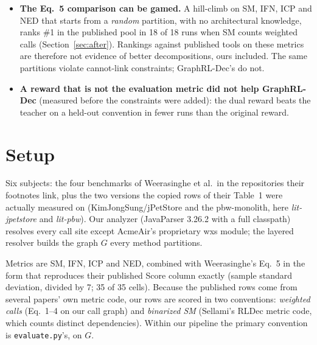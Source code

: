\documentclass[10pt,a4paper]{article}
\begin{document}
\begin{itemize}
\item \textbf{The Eq.~5 comparison can be gamed.} A hill-climb on SM, IFN, ICP and NED that starts from a \emph{random} partition, with no architectural knowledge, ranks \#1 in the published pool in 18 of 18 runs when SM counts weighted calls (Section~\ref{sec:after}). Rankings against published tools on these metrics are therefore not evidence of better decompositions, ours included. The same partitions violate cannot-link constraints; GraphRL-Dec's do not.
\item \textbf{A reward that is not the evaluation metric did not help GraphRL-Dec} (measured before the constraints were added): the dual reward beats the teacher on a held-out convention in fewer runs than the original reward.
\end{itemize}
\section{Setup}
Six subjects: the four benchmarks of Weerasinghe et al.\ in the repositories their footnotes link, plus the two versions the copied rows of their Table~1 were actually measured on (KimJongSung/jPetStore and the pbw-monolith, here \emph{lit-jpetstore} and \emph{lit-pbw}). Our analyzer (JavaParser 3.26.2 with a full classpath) resolves every call site except AcmeAir's proprietary wxs module; the layered resolver builds the graph $G$ every method partitions.
\begin{center}\end{center}
Metrics are SM, IFN, ICP and NED, combined with Weerasinghe's Eq.~5 in the form that reproduces their published Score column exactly (sample standard deviation, divided by 7; 35 of 35 cells). Because the published rows come from several papers' own metric code, our rows are scored in two conventions: \emph{weighted calls} (Eq.~1--4 on our call graph) and \emph{binarized SM} (Sellami's RLDec metric code, which counts distinct dependencies). Within our pipeline the primary convention is \texttt{evaluate.py}'s, on $G$.
\end{document}
